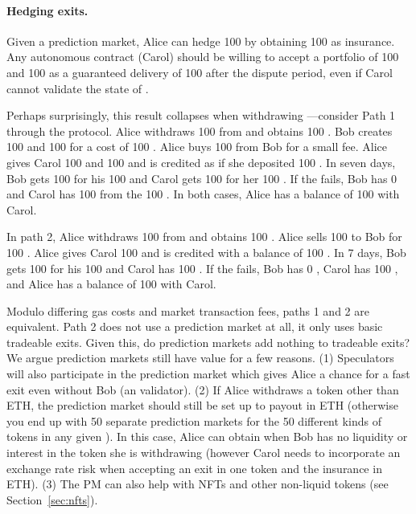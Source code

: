 

\paragraph*{Hedging exits.} Given a prediction market, Alice can hedge 100 \ethxx by obtaining 100 \fail as insurance. Any autonomous \layerone contract (Carol) should be willing to accept a portfolio of 100 \ethxx and 100 \fail as a guaranteed delivery of 100 \ethone after the dispute period, even if Carol cannot validate the state of \layertwo.  

Perhaps surprisingly, this result collapses when withdrawing \ethtwo---consider Path 1 through the protocol. Alice withdraws 100 \ethtwo from \layertwo and obtains 100 \ethxx. Bob creates 100 \fail and 100 \final for a cost of 100 \ethone. Alice buys 100 \fail from Bob for a small fee. Alice gives Carol 100 \ethxx and 100 \fail and is credited as if she deposited 100 \ethone. In seven days, Bob gets 100 \ethone for his 100 \final and Carol gets 100 \ethone for her 100 \ethxx. If the \rblock fails, Bob has 0 \ethone and Carol has 100 \ethone from the 100 \fail. In both cases, Alice has a balance of 100 \ethone with Carol. 

In path 2, Alice withdraws 100 \ethtwo from \layertwo and obtains 100 \ethxx. Alice sells 100 \ethxx to Bob for 100 \ethone. Alice gives Carol 100 \ethone and is credited with a balance of 100 \ethone. In 7 days, Bob gets 100 \ethone for his 100 \ethxx and Carol has 100 \ethone. If the \rblock fails, Bob has 0 \ethone, Carol has 100 \ethone, and Alice has a balance of 100 \ethone with Carol.

Modulo differing gas costs and market transaction fees, paths 1 and 2 are equivalent. Path 2 does not use a prediction market at all, it only uses basic tradeable exits. Given this, do prediction markets add nothing to tradeable exits? We argue prediction markets still have value for a few reasons. (1) Speculators will also participate in the prediction market which gives Alice a chance for a fast exit even without Bob (an \layertwo validator). (2) If Alice withdraws a token other than ETH, the prediction market should still be set up to payout in ETH (otherwise you end up with 50 separate prediction markets for the 50 different kinds of tokens in any given \rblock). In this case, Alice can obtain \fail when Bob has no liquidity or interest in the token she is withdrawing (however Carol needs to incorporate an exchange rate risk when accepting an exit in one token and the insurance in ETH). (3) The PM can also help with NFTs and other non-liquid tokens (see Section~\ref{sec:nfts}).

